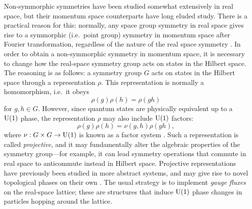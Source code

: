 \label{sec:review}

Non-symmorphic symmetries have been studied somewhat extensively in real space, but their momentum space counterparts have long eluded study. There is a practical reason for this: normally, any space group symmetry in real space gives rise to a symmorphic (i.e.\ point group) symmetry in momentum space after Fourier transformation, regardless of the nature of the real space symmetry \cite{Zhang_nonsymmorphic}. In order to obtain a non-symmorphic symmetry in momentum space, it is necessary to change how the real-space symmetry group acts on states in the Hilbert space. The reasoning is as follows: a symmetry group $G$ acts on states in the Hilbert space through a representation $\rho$. This representation is normally a homomorphism, i.e.\ it obeys
\begin{equation*}
	\rho(g)\rho(h) = \rho(gh)
\end{equation*}
for $g,h\in G$. However, since quantum states are physically equivalent up to a $\operatorname{U}(1)$ phase, the representation $\rho$ may also include $\operatorname{U}(1)$ factors:
\begin{equation*}
	\rho(g)\rho(h) = \nu(g,h)\rho(gh),
\end{equation*}
where $\nu: G\times G\to \operatorname{U}(1)$ is known as a factor system \cite{Chen_gauge-classification}. Such a representation is called \emph{projective}, and it may fundamentally alter the algebraic properties of the symmetry group---for example, it can lead symmetry operations that commute in real space to anticommute instead in Hilbert space. Projective representations have previously been studied in more abstract systems, and may give rise to novel topological phases on their own \cite{ZHY_Z2-projective,Zhao_projective-PT,Shao_gauge,Xue-Wang_acoustic-Mobius,Li-Du_acoustic-Mobius,Chen_gauge-classification}. The usual strategy is to implement \emph{gauge fluxes} on the real-space lattice; these are structures that induce $\operatorname{U}(1)$ phase changes in particles hopping around the lattice. %

